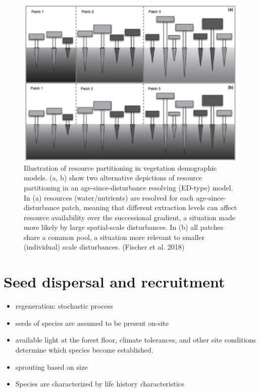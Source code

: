 \documentclass[12pt,oneside]{book}
\begin{document}
\begin{figure}

{\centering \includegraphics[width=0.8\linewidth]{figures/chap6/f631_root_competition} 

}

\caption{Illustration of resource partitioning in vegetation demographic models. (a, b) show two alternative depictions of resource partitioning in an age-since-disturbance resolving (ED-type) model. In (a) resources (water/nutrients) are resolved for each age-since-disturbance patch, meaning that different extraction levels can affect resource availability over the successional gradient, a situation made more likely by large spatial-scale disturbances. In (b) all patches share a common pool, a situation more relevant to smaller (individual) scale disturbances. (Fischer et al. 2018)}\label{fig:f631}
\end{figure}

\section{Seed dispersal and
recruitment}\label{seed-dispersal-and-recruitment}

\begin{itemize}
\item
  regeneration: stochastic process
\item
  seeds of species are assumed to be present on-site
\item
  available light at the forest floor, climate tolerances, and other
  site conditions determine which species become established.
\item
  sprouting based on size
\item
  Species are characterized by life history characteristics
\end{itemize}
\end{document}
